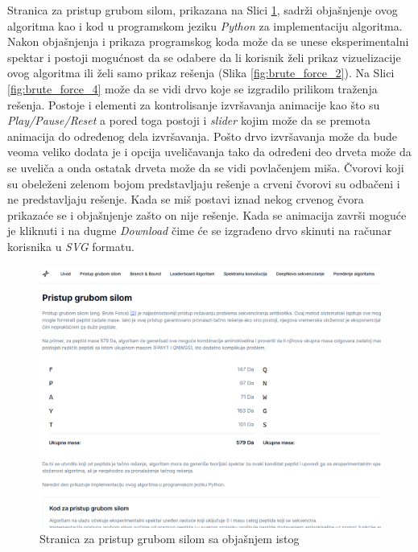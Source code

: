\documentclass[12pt,oneside]{memoir}
\begin{document}
Stranica za pristup grubom silom, prikazana na Slici \ref{fig:brute_force_1}, sadrži objašnjenje ovog algoritma kao i kod u programskom jeziku \emph{Python} za implementaciju algoritma.
Nakon objašnjenja i prikaza programskog koda može da se unese eksperimentalni spektar i postoji mogućnost da se odabere da li korisnik želi prikaz vizuelizacije ovog algoritma ili želi samo prikaz rešenja (Slika \ref{fig:brute_force_2}). Na Slici \ref{fig:brute_force_4} može da se vidi drvo koje se izgradilo prilikom traženja rešenja. Postoje i elementi za kontrolisanje izvršavanja animacije kao što su \emph{Play/Pause/Reset} a pored toga postoji i \emph{slider} kojim može da se premota animacija do određenog dela izvršavanja. Pošto drvo izvršavanja može da bude veoma veliko dodata je i opcija uveličavanja tako da određeni deo drveta može da se uveliča a onda ostatak drveta može da se vidi povlačenjem miša. Čvorovi koji su obeleženi zelenom bojom predstavljaju rešenje a crveni čvorovi su odbačeni i ne predstavljaju rešenje. Kada se miš postavi iznad nekog crvenog čvora prikazaće se i objašnjenje zašto on nije rešenje.
Kada se animacija završi moguće je kliknuti i na dugme \emph{Download} čime će se izgrađeno drvo skinuti na računar korisnika u \emph{SVG} formatu.
\begin{figure}[h]
\centering
\includegraphics[width=1\textwidth]{images/brute_force_1.png}
\caption{Stranica za pristup grubom silom sa objašnjem istog}
\label{fig:brute_force_1}
\end{figure}
\end{document}
